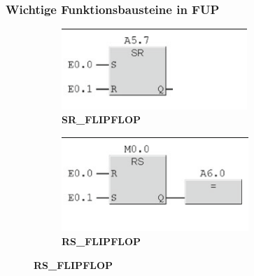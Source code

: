 \subsubsection*{Wichtige Funktionsbausteine in FUP}
\begin{figure}[H]
	\centering
	\begin{subfigure}[b]{0.49\textwidth}
		\centering
		\includegraphics[width=0.8\linewidth]{images/SR_FLIPFLOP}
		\caption{\textbf{SR\_FLIPFLOP} \cite{Hering}}
	\end{subfigure}
	\hfill
	\begin{subfigure}[b]{0.49\textwidth}
		\centering
		\includegraphics[width=0.8\linewidth]{images/RS_FLIPFLOP}
		\caption{\textbf{RS\_FLIPFLOP} \cite{Hering}}
	\end{subfigure}
	
	\vspace{1cm}
	

\end{figure}
